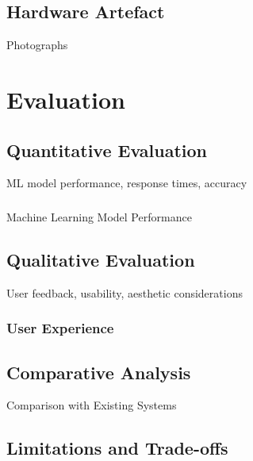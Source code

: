         \subsection{Hardware Artefact}
            \begin{temp}
                Photographs
            \end{temp}
    
    \section{Evaluation}
        \subsection{Quantitative Evaluation}
            \begin{temp}
                ML model performance, response times, accuracy
            \end{temp}
    
            \subsubsection{}{Machine Learning Model Performance}
    
        \subsection{Qualitative Evaluation}
            \begin{temp}
                User feedback, usability, aesthetic considerations
            \end{temp}
        
            \subsubsection{User Experience}
            
        \subsection{Comparative Analysis}
            \begin{temp}
                Comparison with Existing Systems
            \end{temp}
    
        \subsection{Limitations and Trade-offs}
    
